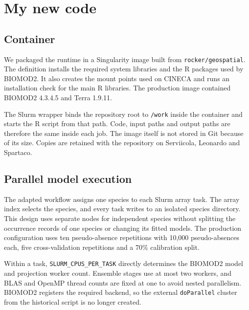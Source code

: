 \chapter{My new code}

\section{Container}


We packaged the runtime in a Singularity image built from \texttt{rocker/geospatial}. The definition installs the required system libraries and the R packages used by BIOMOD2. It also creates the mount points used on CINECA and runs an installation check for the main R libraries. The production image contained BIOMOD2 4.3.4.5 and Terra 1.9.11.

The Slurm wrapper binds the repository root to \texttt{/work} inside the container and starts the R script from that path. Code, input paths and output paths are therefore the same inside each job. The image itself is not stored in Git because of its size. Copies are retained with the repository on Serviicola, Leonardo and Spartaco.


\section{Parallel model execution}

The adapted workflow assigns one species to each Slurm array task. The array index selects the species, and every task writes to an isolated species directory. This design uses separate nodes for independent species without splitting the occurrence records of one species or changing its fitted models. The production configuration uses ten pseudo-absence repetitions with 10,000 pseudo-absences each, five cross-validation repetitions and a 70\% calibration split.

Within a task, \texttt{SLURM\_CPUS\_PER\_TASK} directly determines the BIOMOD2 model and projection worker count. Ensemble stages use at most two workers, and BLAS and OpenMP thread counts are fixed at one to avoid nested parallelism. BIOMOD2 registers the required backend, so the external \texttt{doParallel} cluster from the historical script is no longer created.


